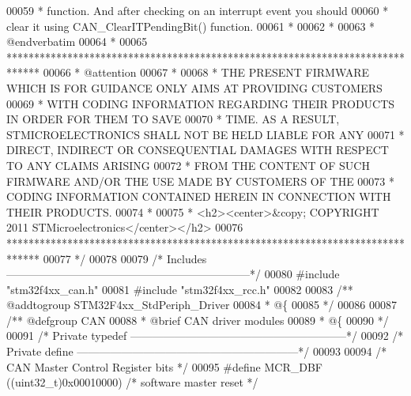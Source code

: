 \begin{DoxyCode}
00059 \textcolor{comment}{  *             function. And after checking on an interrupt event you should }
00060 \textcolor{comment}{  *             clear it using CAN\_ClearITPendingBit() function.            }
00061 \textcolor{comment}{  *               }
00062 \textcolor{comment}{  *              }
00063 \textcolor{comment}{  *  @endverbatim}
00064 \textcolor{comment}{  *         }
00065 \textcolor{comment}{  ******************************************************************************}
00066 \textcolor{comment}{  * @attention}
00067 \textcolor{comment}{  *}
00068 \textcolor{comment}{  * THE PRESENT FIRMWARE WHICH IS FOR GUIDANCE ONLY AIMS AT PROVIDING CUSTOMERS}
00069 \textcolor{comment}{  * WITH CODING INFORMATION REGARDING THEIR PRODUCTS IN ORDER FOR THEM TO SAVE}
00070 \textcolor{comment}{  * TIME. AS A RESULT, STMICROELECTRONICS SHALL NOT BE HELD LIABLE FOR ANY}
00071 \textcolor{comment}{  * DIRECT, INDIRECT OR CONSEQUENTIAL DAMAGES WITH RESPECT TO ANY CLAIMS ARISING}
00072 \textcolor{comment}{  * FROM THE CONTENT OF SUCH FIRMWARE AND/OR THE USE MADE BY CUSTOMERS OF THE}
00073 \textcolor{comment}{  * CODING INFORMATION CONTAINED HEREIN IN CONNECTION WITH THEIR PRODUCTS.}
00074 \textcolor{comment}{  *}
00075 \textcolor{comment}{  * <h2><center>&copy; COPYRIGHT 2011 STMicroelectronics</center></h2>}
00076 \textcolor{comment}{  ******************************************************************************  }
00077 \textcolor{comment}{  */}
00078 
00079 \textcolor{comment}{/* Includes ------------------------------------------------------------------*/}
00080 \textcolor{preprocessor}{#}\textcolor{preprocessor}{include} "stm32f4xx_can.h"
00081 \textcolor{preprocessor}{#}\textcolor{preprocessor}{include} "stm32f4xx_rcc.h"
00082 
00083 \textcolor{comment}{/** @addtogroup STM32F4xx\_StdPeriph\_Driver}
00084 \textcolor{comment}{  * @\{}
00085 \textcolor{comment}{  */}
00086 
00087 \textcolor{comment}{/** @defgroup CAN }
00088 \textcolor{comment}{  * @brief CAN driver modules}
00089 \textcolor{comment}{  * @\{}
00090 \textcolor{comment}{  */}
00091 \textcolor{comment}{/* Private typedef -----------------------------------------------------------*/}
00092 \textcolor{comment}{/* Private define ------------------------------------------------------------*/}
00093 
00094 \textcolor{comment}{/* CAN Master Control Register bits */}
00095 \textcolor{preprocessor}{#}\textcolor{preprocessor}{define} \textcolor{preprocessor}{MCR\_DBF}           \textcolor{preprocessor}{(}\textcolor{preprocessor}{(}\textcolor{preprocessor}{uint32\_t}\textcolor{preprocessor}{)}0x00010000\textcolor{preprocessor}{)} \textcolor{comment}{/* software master reset */}

\end{DoxyCode}
